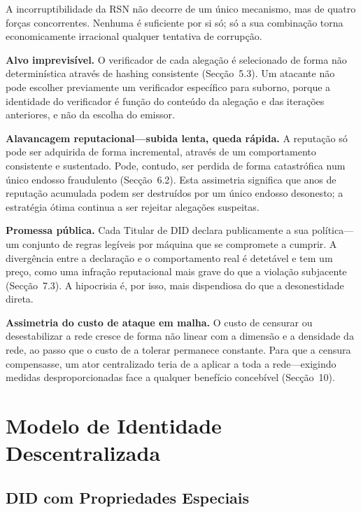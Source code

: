 \documentclass[11pt,a4paper,twocolumn]{article}
\begin{document}
A incorruptibilidade da RSN não decorre de um único mecanismo, mas de quatro forças concorrentes. Nenhuma é suficiente por si só; só a sua combinação torna economicamente irracional qualquer tentativa de corrupção.

\textbf{Alvo imprevisível.} O verificador de cada alegação é selecionado de forma não determinística através de hashing consistente (Secção~5.3). Um atacante não pode escolher previamente um verificador específico para suborno, porque a identidade do verificador é função do conteúdo da alegação e das iterações anteriores, e não da escolha do emissor.

\textbf{Alavancagem reputacional---subida lenta, queda rápida.} A reputação só pode ser adquirida de forma incremental, através de um comportamento consistente e sustentado. Pode, contudo, ser perdida de forma catastrófica num único endosso fraudulento (Secção~6.2). Esta assimetria significa que anos de reputação acumulada podem ser destruídos por um único endosso desonesto; a estratégia ótima continua a ser rejeitar alegações suspeitas.

\textbf{Promessa pública.} Cada Titular de DID declara publicamente a sua política---um conjunto de regras legíveis por máquina que se compromete a cumprir. A divergência entre a declaração e o comportamento real é detetável e tem um preço, como uma infração reputacional mais grave do que a violação subjacente (Secção~7.3). A hipocrisia é, por isso, mais dispendiosa do que a desonestidade direta.

\textbf{Assimetria do custo de ataque em malha.} O custo de censurar ou desestabilizar a rede cresce de forma não linear com a dimensão e a densidade da rede, ao passo que o custo de a tolerar permanece constante. Para que a censura compensasse, um ator centralizado teria de a aplicar a toda a rede---exigindo medidas desproporcionadas face a qualquer benefício concebível (Secção~10).

\section{Modelo de Identidade Descentralizada}

\subsection{DID com Propriedades Especiais}
\end{document}
